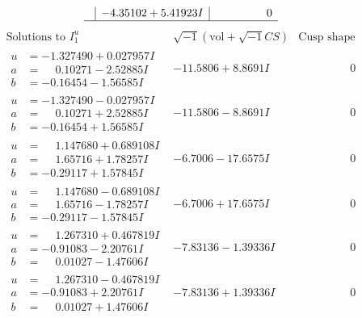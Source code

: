 \documentclass[1p]{elsarticle_modified}
\theoremstyle{definition}
\newcommand{\I}{\sqrt{-1}}
\begin{document}
$$\begin{array}{c|c|c}
 & -4.35102 + 5.41923 I & \phantom{-0.000000 } 0\\
 \hline 
 \end{array}$$\newpage$$\begin{array}{c|c|c}  
\text{Solutions to }I^u_{1}& \I (\text{vol} + \sqrt{-1}CS) & \text{Cusp shape}\\
 \hline 
\begin{aligned}
u &= -1.327490 + 0.027957 I \\
a &= \phantom{-}0.10271 - 2.52885 I \\
b &= -0.16454 - 1.56585 I\end{aligned}
 & -11.5806 + 8.8691 I & \phantom{-0.000000 } 0 \\ \hline\begin{aligned}
u &= -1.327490 - 0.027957 I \\
a &= \phantom{-}0.10271 + 2.52885 I \\
b &= -0.16454 + 1.56585 I\end{aligned}
 & -11.5806 - 8.8691 I & \phantom{-0.000000 } 0 \\ \hline\begin{aligned}
u &= \phantom{-}1.147680 + 0.689108 I \\
a &= \phantom{-}1.65716 + 1.78257 I \\
b &= -0.29117 + 1.57845 I\end{aligned}
 & -6.7006 - 17.6575 I & \phantom{-0.000000 } 0 \\ \hline\begin{aligned}
u &= \phantom{-}1.147680 - 0.689108 I \\
a &= \phantom{-}1.65716 - 1.78257 I \\
b &= -0.29117 - 1.57845 I\end{aligned}
 & -6.7006 + 17.6575 I & \phantom{-0.000000 } 0 \\ \hline\begin{aligned}
u &= \phantom{-}1.267310 + 0.467819 I \\
a &= -0.91083 - 2.20761 I \\
b &= \phantom{-}0.01027 - 1.47606 I\end{aligned}
 & -7.83136 - 1.39336 I & \phantom{-0.000000 } 0 \\ \hline\begin{aligned}
u &= \phantom{-}1.267310 - 0.467819 I \\
a &= -0.91083 + 2.20761 I \\
b &= \phantom{-}0.01027 + 1.47606 I\end{aligned}
 & -7.83136 + 1.39336 I & \phantom{-0.000000 } 0 \\ \hline\begin{aligned}

\end{aligned}
\end{array}$$
\end{document}
